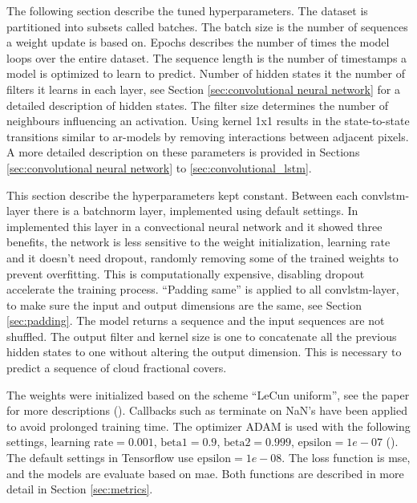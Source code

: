 The following section describe the tuned hyperparameters. The dataset is partitioned into subsets called batches. The batch size is the number of sequences a weight update is based on. Epochs describes the number of times the model loops over the entire dataset. The sequence length is the number of timestamps a model is optimized to learn to predict. Number of hidden states it the number of filters it learns in each layer, see Section \ref{sec:convolutional neural network} for a detailed description of hidden states. 
The filter size determines the number of neighbours influencing an activation. Using kernel 1x1 results in the state-to-state transitions similar to \acrshort{ar}-models by removing interactions between adjacent pixels. A more detailed description on these parameters is provided in Sections \ref{sec:convolutional neural network} to \ref{sec:convolutional_lstm}. 

This section describe the hyperparameters kept constant. Between each \acrshort{convlstm}-layer there is a \acrfull{batchnorm} layer, implemented using default settings. In  implemented this layer in a convectional neural network and it showed three benefits, the network is less sensitive to the weight initialization, learning rate and it doesn't need dropout, randomly removing some of the trained weights to prevent overfitting. This is computationally expensive, disabling dropout accelerate the training process.
``Padding same'' is applied to all \acrshort{convlstm}-layer, to make sure the input and output dimensions are the same, see Section \ref{sec:padding}. The model returns a sequence and the input sequences are not shuffled. The output filter and kernel size is one to concatenate all the previous hidden states to one without altering the output dimension. This is necessary to predict a sequence of cloud fractional covers. 

The weights were initialized based on the scheme ``LeCun uniform'', see the paper for more descriptions (\cite{Lecun98efficientbackprop}). Callbacks such as %
terminate on NaN's have been applied to avoid prolonged training time. The optimizer ADAM is used with the following settings, $\text{learning rate}=0.001$, $\text{beta1}=0.9$, $\text{beta2}=0.999$, $\text{epsilon}=1e-07$ (\cite{Kingma2015Adam:Optimization}). The default settings in Tensorflow use $\text{epsilon}=1e-08$. The loss function is \acrfull{mse}, and the models are evaluate based on \acrfull{mae}.
Both functions are described in more detail in Section \ref{sec:metrics}. %

